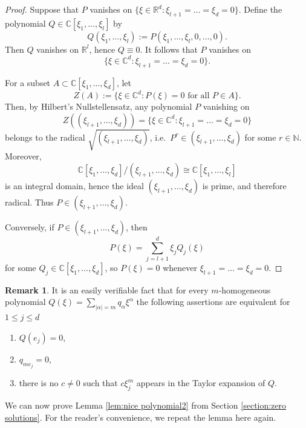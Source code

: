 \documentclass[a4paper,10pt]{amsart}
\newtheorem*{crucial lemma}{Lemma \ref{lem:nice polynomial2}}
\theoremstyle{definition}
\newtheorem{remark}[theorem]{Remark}
\newcommand{\R}{\mathbb{R}}
\newcommand{\C}{\mathbb{C}}
\newcommand{\N}{\mathbb{N}}
\begin{document}
\begin{proof}
Suppose that $P$ vanishes on $\{\xi\in\R^d\colon \xi_{l+1}=\ldots=\xi_d=0\}$. 
Define the polynomial $Q\in\C[\xi_1,\ldots,\xi_l]$ by
\[
Q(\xi_1,\ldots,\xi_l):=P(\xi_1,\ldots,\xi_l,0,\ldots,0).
\]
Then $Q$ vanishes on $\R^l$, hence $Q\equiv 0$. It follows that $P$ vanishes on 
\[\{\xi\in\C^d\colon \xi_{l+1}=\ldots=\xi_d=0\}.\]
	
For a subset $A\subset \C[\xi_1,\ldots,\xi_d]$, let
\[
Z(A):=\{\xi\in\C^d\colon P(\xi)=0 \text{ for all } P\in A\}.
\]
Then, by Hilbert's Nullstellensatz, any polynomial $P$ vanishing on
\[Z((\xi_{l+1},\ldots,\xi_d))=\{\xi\in\C^d\colon \xi_{l+1}=\ldots=\xi_d=0\}\]
belongs to the radical $\sqrt{(\xi_{l+1},\ldots,\xi_d)}$, i.e.~$P^r\in (\xi_{l+1},\ldots,\xi_d)$ for some $r\in\N$.
Moreover,
\[\C[\xi_1,\ldots,\xi_d]/(\xi_{l+1},\ldots,\xi_d)\cong \C[\xi_1,\ldots,\xi_l]\]
is an integral domain, hence the ideal $(\xi_{l+1},\ldots,\xi_d)$ is prime, and therefore radical. Thus $P\in (\xi_{l+1},\ldots,\xi_d)$.
	
Conversely, if $P\in (\xi_{l+1},\ldots,\xi_d)$, then
\[
P(\xi)=\sum_{j=l+1}^d \xi_j Q_j(\xi)
\]
for some $Q_j\in\C[\xi_1,\ldots,\xi_d]$, so $P(\xi)=0$ whenever $\xi_{l+1}=\ldots=\xi_d=0$.
\end{proof}

\begin{remark}\label{rem:homogeneous polynomials}
It is an easily verifiable fact that for every $m$-homogeneous polynomial $Q(\xi)=\sum_{|\alpha|=m}q_\alpha\xi^\alpha$ the following assertions are equivalent for $1\leq j\leq d$
		\begin{enumerate}
			\item[(i-a)] $Q(e_j)=0$,
			\item[(i-b)] $q_{me_j}=0$,
			\item[(i-c)] there is no $c\neq 0$ such that $c\xi_j^m$ appears in the Taylor expansion of $Q$.
		\end{enumerate}
\end{remark}

We can now prove Lemma \ref{lem:nice polynomial2} from Section \ref{section:zero solutions}. For the reader's convenience, we repeat the lemma here again.
\end{document}
